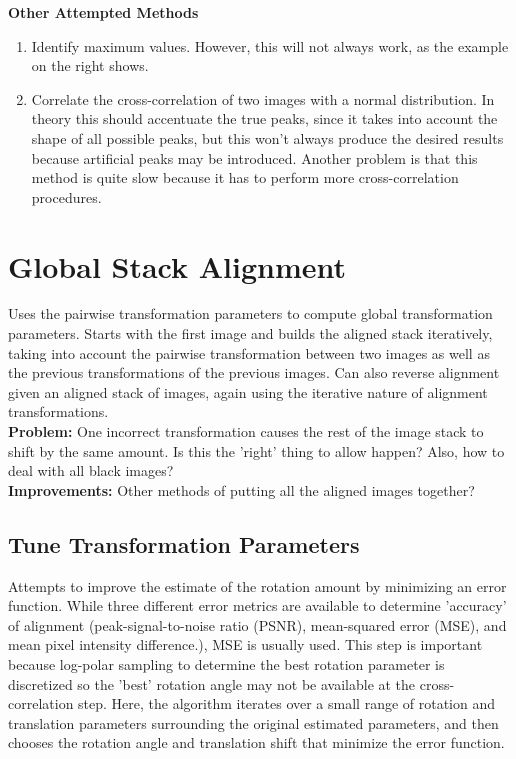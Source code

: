 \documentclass{article}
\begin{document}
\textbf{Other Attempted Methods}
\begin{enumerate}
\item Identify maximum values. However, this will not always work, as the example on the right shows.
\item Correlate the cross-correlation of two images with a normal distribution. In theory this should accentuate the true peaks, since it takes into account the shape of all possible peaks, but this won't always produce the desired results because artificial peaks may be introduced. Another problem is that this method is quite slow because it has to perform more cross-correlation procedures. 
\end{enumerate}

\section{Global Stack Alignment}
Uses the pairwise transformation parameters to compute global transformation parameters. Starts with the first image and builds the aligned stack iteratively, taking into account the pairwise transformation between two images as well as the previous transformations of the previous images. Can also reverse alignment given an aligned stack of images, again using the iterative nature of alignment transformations. \\
\textbf{Problem:} One incorrect transformation causes the rest of the image stack to shift by the same amount. Is this the 'right' thing to allow happen? Also, how to deal with all black images? \\
\textbf{Improvements:} Other methods of putting all the aligned images together?

\subsection{Tune Transformation Parameters}
Attempts to improve the estimate of the rotation amount by minimizing an error function. While three different error metrics are available to determine 'accuracy' of alignment (peak-signal-to-noise ratio (PSNR), mean-squared error (MSE), and mean pixel intensity difference.), MSE is usually used. This step is important because log-polar sampling to determine the best rotation parameter is discretized so the 'best' rotation angle may not be available at the cross-correlation step. Here, the algorithm iterates over a small range of rotation and translation parameters surrounding the original estimated parameters, and then chooses the rotation angle and translation shift that minimize the error function.
\end{document}
